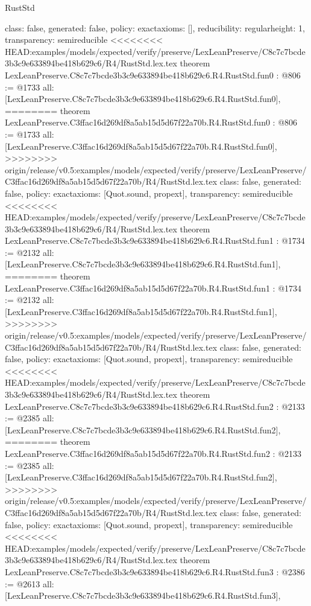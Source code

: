 \begin{lexlean}{RustStd}
\begin{coremodule}
{\begin{coremodule}
{{{  class: false,
  generated: false,
  policy: exact{axioms: []},
  reducibility: regular{height: 1},
  transparency: semireducible
}
<<<<<<<< HEAD:examples/models/expected/verify/preserve/LexLeanPreserve/C8c7c7bcde3b3c9e633894be418b629c6/R4/RustStd.lex.tex
theorem LexLeanPreserve.C8c7c7bcde3b3c9e633894be418b629c6.R4.RustStd.fun0 : @806 := @1733 {
  all: [LexLeanPreserve.C8c7c7bcde3b3c9e633894be418b629c6.R4.RustStd.fun0],
========
theorem LexLeanPreserve.C3ffac16d269df8a5ab15d5d67f22a70b.R4.RustStd.fun0 : @806 := @1733 {
  all: [LexLeanPreserve.C3ffac16d269df8a5ab15d5d67f22a70b.R4.RustStd.fun0],
>>>>>>>> origin/release/v0.5:examples/models/expected/verify/preserve/LexLeanPreserve/C3ffac16d269df8a5ab15d5d67f22a70b/R4/RustStd.lex.tex
  class: false,
  generated: false,
  policy: exact{axioms: [Quot.sound, propext]},
  transparency: semireducible
}
<<<<<<<< HEAD:examples/models/expected/verify/preserve/LexLeanPreserve/C8c7c7bcde3b3c9e633894be418b629c6/R4/RustStd.lex.tex
theorem LexLeanPreserve.C8c7c7bcde3b3c9e633894be418b629c6.R4.RustStd.fun1 : @1734 := @2132 {
  all: [LexLeanPreserve.C8c7c7bcde3b3c9e633894be418b629c6.R4.RustStd.fun1],
========
theorem LexLeanPreserve.C3ffac16d269df8a5ab15d5d67f22a70b.R4.RustStd.fun1 : @1734 := @2132 {
  all: [LexLeanPreserve.C3ffac16d269df8a5ab15d5d67f22a70b.R4.RustStd.fun1],
>>>>>>>> origin/release/v0.5:examples/models/expected/verify/preserve/LexLeanPreserve/C3ffac16d269df8a5ab15d5d67f22a70b/R4/RustStd.lex.tex
  class: false,
  generated: false,
  policy: exact{axioms: [Quot.sound, propext]},
  transparency: semireducible
}
<<<<<<<< HEAD:examples/models/expected/verify/preserve/LexLeanPreserve/C8c7c7bcde3b3c9e633894be418b629c6/R4/RustStd.lex.tex
theorem LexLeanPreserve.C8c7c7bcde3b3c9e633894be418b629c6.R4.RustStd.fun2 : @2133 := @2385 {
  all: [LexLeanPreserve.C8c7c7bcde3b3c9e633894be418b629c6.R4.RustStd.fun2],
========
theorem LexLeanPreserve.C3ffac16d269df8a5ab15d5d67f22a70b.R4.RustStd.fun2 : @2133 := @2385 {
  all: [LexLeanPreserve.C3ffac16d269df8a5ab15d5d67f22a70b.R4.RustStd.fun2],
>>>>>>>> origin/release/v0.5:examples/models/expected/verify/preserve/LexLeanPreserve/C3ffac16d269df8a5ab15d5d67f22a70b/R4/RustStd.lex.tex
  class: false,
  generated: false,
  policy: exact{axioms: [Quot.sound, propext]},
  transparency: semireducible
}
<<<<<<<< HEAD:examples/models/expected/verify/preserve/LexLeanPreserve/C8c7c7bcde3b3c9e633894be418b629c6/R4/RustStd.lex.tex
theorem LexLeanPreserve.C8c7c7bcde3b3c9e633894be418b629c6.R4.RustStd.fun3 : @2386 := @2613 {
  all: [LexLeanPreserve.C8c7c7bcde3b3c9e633894be418b629c6.R4.RustStd.fun3],
}}}}}}
\end{coremodule}}
\end{coremodule}
\end{lexlean}
